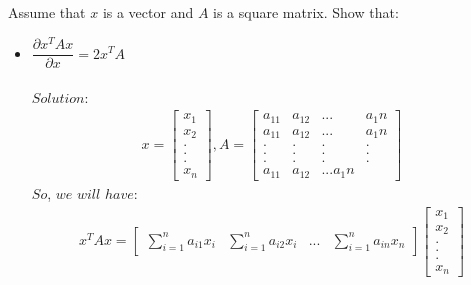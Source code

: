 \documentclass[a4paper]{article}
\begin{document}
        \subsection{}
       Assume that $x$ is a vector and $A$ is a square matrix. Show that:
        \begin{itemize}
        \item $\dfrac{\partial x^{T}Ax}{\partial x}=2x^{T}A$\\
        \\
        $Solution:$ \\
        
        \begin{eqnarray*}
           x =  \begin{bmatrix}
            {x_1}\\
            {x_2} \\
            .\\
            .\\
            .\\
            {x_n}
            \end{bmatrix}, A =  \begin{bmatrix}
            {a_11}&{a_12}&...&{a_1n}\\
            {a_11}&{a_12}&...&{a_1n}\\
            .&.&.&.\\
            .&.&.&.\\
            .&.&.&.\\
            {a_11}&{a_12}&...{a_1n}
            \end{bmatrix}
        \end{eqnarray*}
        $So$, $we$ $will$ $have$:\\
        \begin{eqnarray*}
            {x^T}Ax = \begin{bmatrix}
                \sum_{i=1}^n {a_{i1}}{x_i} & \sum_{i=1}^n {a_{i2}}{x_i} & ... & \sum_{i=1}^n {a_{in}}{x_n}\end{bmatrix} \begin{bmatrix}
                    {x_1}\\
                    {x_2}\\
                    .\\
                    .\\
                    .\\
                    {x_n}

\end{bmatrix}
\end{eqnarray*}
\end{itemize}
\end{document}
